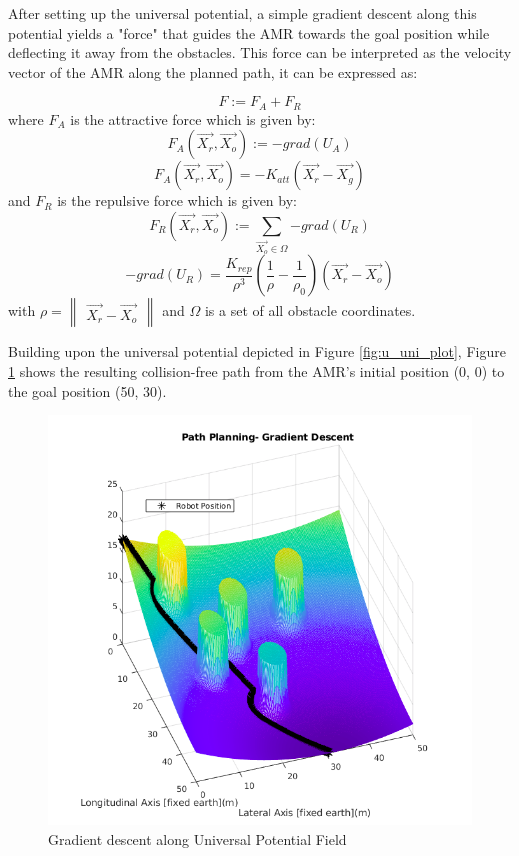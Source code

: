 \documentclass[a4paper, twocolumn]{article}
\begin{document}
After setting up the universal potential, a simple gradient descent along this potential yields a "force" that guides the AMR towards the goal position 
while deflecting it away from the obstacles. This force can be interpreted as the velocity vector of the AMR along the planned path, 
it can be expressed as: 

$$F:= F_{A} + F_{R}$$
\noindent
where $F_{A}$ is the attractive force which is given by:
$$F_{A}(\vec{X_{r}}, \vec{X_{o}}):= -grad(U_{A})$$
$$F_{A}(\vec{X_{r}}, \vec{X_{o}})= -K_{att} \left(\vec{X_{r}} - \vec{X_{g}}\right)$$
\noindent
and $F_{R}$ is the repulsive force which is given by:
$$F_{R}(\vec{X_{r}}, \vec{X_{o}}):= \sum_{ \vec{X_{o}} \in \Omega}{-grad(U_{R})} $$
$$-grad(U_{R})= \frac{K_{rep}}{\rho^{3}} 
        \left( \frac{1}{\rho} - \frac{1}{\rho_{0}} \right) 
        \left(\vec{X_{r}} - \vec{X_{o}}\right) $$
\noindent
with $\rho= \begin{Vmatrix}\vec{X_{r}} - \vec{X_{o}}\end{Vmatrix}$ and $\Omega$ is a set of all obstacle coordinates.
 
Building upon the universal potential depicted in Figure \ref{fig:u_uni_plot}, Figure \ref{fig:path} shows the resulting collision-free path from the AMR's initial position (0, 0) to the goal position (50, 30).

\begin{figure}
    \centering
    \includegraphics[scale=1.2]{presentation/img/path.png}
    \caption{Gradient descent along Universal Potential Field}
    \label{fig:path}
\end{figure}
\end{document}
